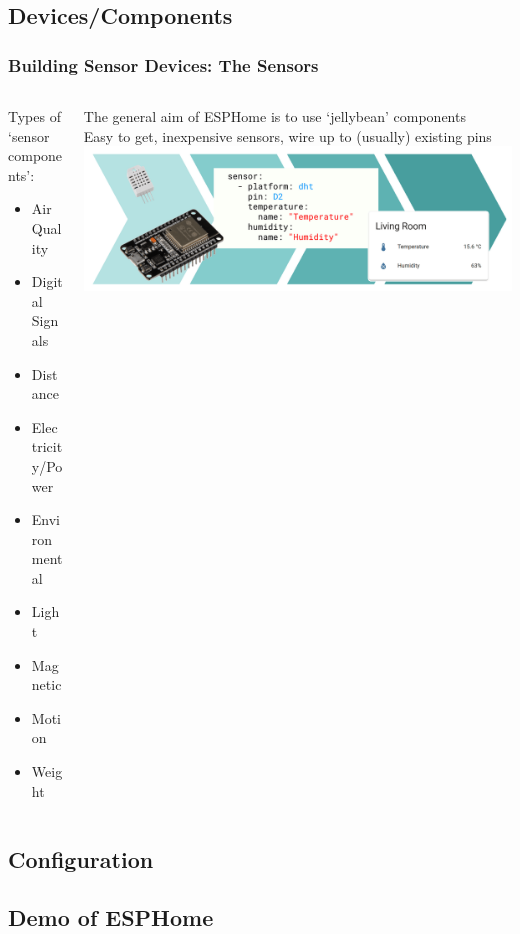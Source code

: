 \documentclass[aspectratio=169]{beamer}
\begin{document}
\subsection{Devices/Components}
\begin{frame}[fragile]
  \frametitle{Building Sensor Devices: The Sensors}
  \begin{columns}[]
    \begin{column}[T]{0.45\paperwidth}
      Types of `sensor components':
      \begin{itemize}%
        \item{Air Quality}
        \item{Digital Signals}
        \item{Distance}
        \item{Electricity/Power}
        \item{Environmental}
        \item{Light}
        \item{Magnetic}
        \item{Motion}
        \item{Weight}
      \end{itemize}
    \end{column}
    \begin{column}[T]{0.45\paperwidth}
      The general aim of ESPHome is to use `jellybean' components\\
      Easy to get, inexpensive sensors, wire up to (usually) existing pins
      \vspace{1cm}
      \includegraphics[width=0.45\paperwidth,keepaspectratio]{images/esp.png}
    \end{column}
  \end{columns}
\end{frame}
\subsection{Configuration}
\frame{\subsectionpage}
\subsection{Demo of ESPHome}
\frame{\subsectionpage}
\end{document}
